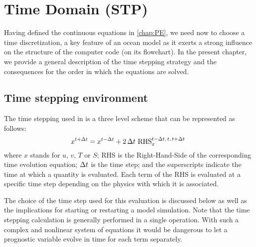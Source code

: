 \documentclass[../main/NEMO_manual]{subfiles}
\begin{document}
\chapter{Time Domain (STP)}
\label{chap:STP}
\minitoc



\newpage

Having defined the continuous equations in \autoref{chap:PE}, we need now to choose a time discretization,
a key feature of an ocean model as it exerts a strong influence on the structure of the computer code
(\ie on its flowchart).
In the present chapter, we provide a general description of the \NEMO time stepping strategy and
the consequences for the order in which the equations are solved.

\section{Time stepping environment}
\label{sec:STP_environment}

The time stepping used in \NEMO is a three level scheme that can be represented as follows:
\begin{equation}
  \label{eq:STP}
  x^{t + \Delta t} = x^{t - \Delta t} + 2 \, \Delta t \ \text{RHS}_x^{t - \Delta t, \, t, \, t + \Delta t}
\end{equation} 
where $x$ stands for $u$, $v$, $T$ or $S$;
RHS is the Right-Hand-Side of the corresponding time evolution equation;
$\Delta t$ is the time step;
and the superscripts indicate the time at which a quantity is evaluated.
Each term of the RHS is evaluated at a specific time step depending on the physics with which it is associated.

The choice of the time step used for this evaluation is discussed below as well as
the implications for starting or restarting a model simulation.
Note that the time stepping calculation is generally performed in a single operation.
With such a complex and nonlinear system of equations it would be dangerous to let a prognostic variable evolve in
time for each term separately.
\end{document}
